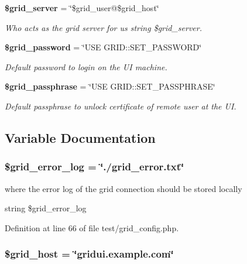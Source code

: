 \begin{CompactItemize}
{\bf \$grid\_\-server} = \char`\"{}\$grid\_\-user@\$grid\_\-host\char`\"{}
\begin{CompactList}\small\item\em Who acts as the grid server for us  string \$grid\_\-server. \item\end{CompactList}\item 
{\bf \$grid\_\-password} = \char`\"{}USE GRID::SET\_\-PASSWORD\char`\"{}
\begin{CompactList}\small\item\em Default password to login on the UI machine. \item\end{CompactList}\item 
{\bf \$grid\_\-passphrase} = \char`\"{}USE GRID::SET\_\-PASSPHRASE\char`\"{}
\begin{CompactList}\small\item\em Default passphrase to unlock certificate of remote user at the UI. \item\end{CompactList}\end{CompactItemize}


\subsection{Variable Documentation}
\subsubsection{\setlength{\rightskip}{0pt plus 5cm}\$grid\_\-error\_\-log = \char`\"{}./grid\_\-error.txt\char`\"{}}\label{test_2grid__config_8php_a2}


where the error log of the grid connection should be stored locally 

string \$grid\_\-error\_\-log 

Definition at line 66 of file test/grid\_\-config.php.
\subsubsection{\setlength{\rightskip}{0pt plus 5cm}\$grid\_\-host = \char`\"{}gridui.example.com\char`\"{}}\label{test_2grid__config_8php_a4}


